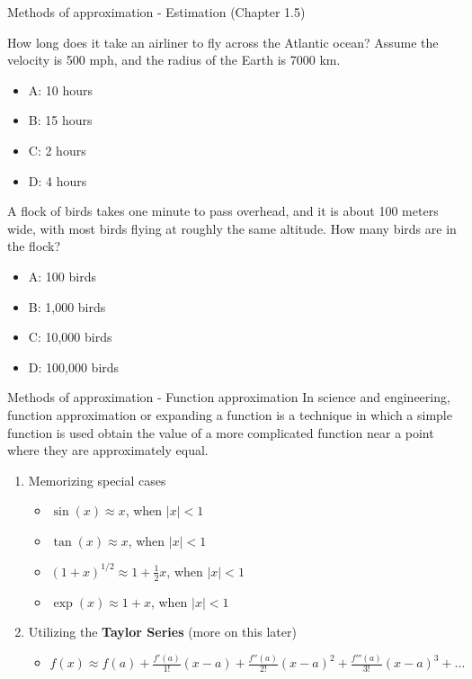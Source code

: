 \documentclass{beamer}
\begin{document}
\begin{frame}{Methods of approximation - Estimation (Chapter 1.5)}
\small
\begin{minipage}[b]{0.45\linewidth}
How long does it take an airliner to fly across the Atlantic ocean?  Assume the velocity is 500 mph, and the radius of the Earth is 7000 km.
\vspace{0.6cm}
\begin{itemize}
\item A: 10 hours
\item B: 15 hours
\item C: 2 hours
\item D: 4 hours
\end{itemize}
\end{minipage}
\hspace{0.5cm}
\begin{minipage}[b]{0.45\linewidth}
A flock of birds takes one minute to pass overhead, and it is about 100 meters wide, with most birds flying at roughly the same altitude.  How many birds are in the flock?
\vspace{0.1cm}
\begin{itemize}
\item A: 100 birds
\item B: 1,000 birds
\item C: 10,000 birds
\item D: 100,000 birds
\end{itemize}
\end{minipage}
\end{frame}

\begin{frame}{Methods of approximation - Function approximation}
In science and engineering, \alert{function approximation} or \alert{expanding a function} is a technique in which a simple function is used obtain the value of a more complicated function near a point where they are approximately equal. 
\begin{enumerate}
\item Memorizing \alert{special cases}
\begin{itemize}
\item $\sin(x) \approx x$, when $|x| < 1$
\item $\tan(x) \approx x$, when $|x| < 1$
\item $(1+x)^{1/2} \approx 1+ \frac{1}{2}x$, when $|x| < 1$
\item $\exp(x) \approx 1 + x$, when $|x| < 1$
\end{itemize}
\item Utilizing the \textbf{Taylor Series} (more on this later)
\begin{itemize}
\item $f(x) \approx f(a) + \frac{f'(a)}{1!}(x-a) + \frac{f''(a)}{2!}(x-a)^2 + \frac{f'''(a)}{3!}(x-a)^3 + ...$
\end{itemize}
\end{enumerate}
\end{frame}
\end{document}
